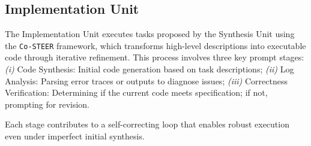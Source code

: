 \documentclass{article}
\begin{document}
\subsection{Implementation Unit}
The Implementation Unit executes tasks proposed by the Synthesis Unit using the \texttt{Co-STEER} framework, which transforms high-level descriptions into executable code through iterative refinement. This process involves three key prompt stages: \textit{(i)} Code Synthesis: Initial code generation based on task descriptions; \textit{(ii)} Log Analysis: Parsing error traces or outputs to diagnose issues; \textit{(iii)} Correctness Verification: Determining if the current code meets specification; if not, prompting for revision.

Each stage contributes to a self-correcting loop that enables robust execution even under imperfect initial synthesis.
\end{document}
